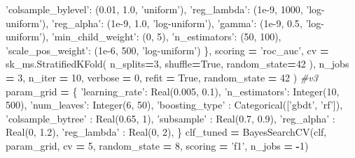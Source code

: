 \documentclass[]{book}
\newenvironment{Shaded}{\begin{snugshade}}{\end{snugshade}}
\newcommand{\DecValTok}[1]{\textcolor[rgb]{0.00,0.00,0.81}{#1}}
\newcommand{\FloatTok}[1]{\textcolor[rgb]{0.00,0.00,0.81}{#1}}
\newcommand{\StringTok}[1]{\textcolor[rgb]{0.31,0.60,0.02}{#1}}
\newcommand{\CommentTok}[1]{\textcolor[rgb]{0.56,0.35,0.01}{\textit{#1}}}
\newcommand{\VariableTok}[1]{\textcolor[rgb]{0.00,0.00,0.00}{#1}}
\newcommand{\OperatorTok}[1]{\textcolor[rgb]{0.81,0.36,0.00}{\textbf{#1}}}
\newcommand{\NormalTok}[1]{#1}
\begin{document}
\begin{Shaded}
\begin{Highlighting}[]
        \StringTok{'colsample_bylevel'}\NormalTok{: (}\FloatTok{0.01}\NormalTok{, }\FloatTok{1.0}\NormalTok{, }\StringTok{'uniform'}\NormalTok{),}
        \StringTok{'reg_lambda'}\NormalTok{: (}\FloatTok{1e-9}\NormalTok{, }\DecValTok{1000}\NormalTok{, }\StringTok{'log-uniform'}\NormalTok{),}
        \StringTok{'reg_alpha'}\NormalTok{: (}\FloatTok{1e-9}\NormalTok{, }\FloatTok{1.0}\NormalTok{, }\StringTok{'log-uniform'}\NormalTok{),}
        \StringTok{'gamma'}\NormalTok{: (}\FloatTok{1e-9}\NormalTok{, }\FloatTok{0.5}\NormalTok{, }\StringTok{'log-uniform'}\NormalTok{),}
        \StringTok{'min_child_weight'}\NormalTok{: (}\DecValTok{0}\NormalTok{, }\DecValTok{5}\NormalTok{),}
        \StringTok{'n_estimators'}\NormalTok{: (}\DecValTok{50}\NormalTok{, }\DecValTok{100}\NormalTok{),}
        \StringTok{'scale_pos_weight'}\NormalTok{: (}\FloatTok{1e-6}\NormalTok{, }\DecValTok{500}\NormalTok{, }\StringTok{'log-uniform'}\NormalTok{)}
\NormalTok{    \},    }
\NormalTok{    scoring }\OperatorTok{=} \StringTok{'roc_auc'}\NormalTok{,}
\NormalTok{    cv }\OperatorTok{=}\NormalTok{ sk_ms.StratifiedKFold(}
\NormalTok{        n_splits}\OperatorTok{=}\DecValTok{3}\NormalTok{,}
\NormalTok{        shuffle}\OperatorTok{=}\VariableTok{True}\NormalTok{,}
\NormalTok{        random_state}\OperatorTok{=}\DecValTok{42}
\NormalTok{    ),}
\NormalTok{    n_jobs }\OperatorTok{=} \DecValTok{3}\NormalTok{,}
\NormalTok{    n_iter }\OperatorTok{=} \DecValTok{10}\NormalTok{,   }
\NormalTok{    verbose }\OperatorTok{=} \DecValTok{0}\NormalTok{,}
\NormalTok{    refit }\OperatorTok{=} \VariableTok{True}\NormalTok{,}
\NormalTok{    random_state }\OperatorTok{=} \DecValTok{42}
\NormalTok{)}
\CommentTok{#v3}
\NormalTok{param_grid }\OperatorTok{=}\NormalTok{ \{}
    \StringTok{'learning_rate'}\NormalTok{: Real(}\FloatTok{0.005}\NormalTok{, }\FloatTok{0.1}\NormalTok{), }\StringTok{'n_estimators'}\NormalTok{: Integer(}\DecValTok{10}\NormalTok{, }\DecValTok{500}\NormalTok{),}
    \StringTok{'num_leaves'}\NormalTok{: Integer(}\DecValTok{6}\NormalTok{, }\DecValTok{50}\NormalTok{), }\StringTok{'boosting_type'}\NormalTok{ : Categorical([}\StringTok{'gbdt'}\NormalTok{, }\StringTok{'rf'}\NormalTok{]),}
    \StringTok{'colsample_bytree'}\NormalTok{ : Real(}\FloatTok{0.65}\NormalTok{, }\DecValTok{1}\NormalTok{), }\StringTok{'subsample'}\NormalTok{ : Real(}\FloatTok{0.7}\NormalTok{, }\FloatTok{0.9}\NormalTok{),}
    \StringTok{'reg_alpha'}\NormalTok{ : Real(}\DecValTok{0}\NormalTok{, }\FloatTok{1.2}\NormalTok{), }\StringTok{'reg_lambda'}\NormalTok{ : Real(}\DecValTok{0}\NormalTok{, }\DecValTok{2}\NormalTok{),}
\NormalTok{    \}}
\NormalTok{clf_tuned }\OperatorTok{=}\NormalTok{ BayesSearchCV(clf, param_grid, cv }\OperatorTok{=} \DecValTok{5}\NormalTok{, random_state }\OperatorTok{=} \DecValTok{8}\NormalTok{, scoring }\OperatorTok{=} \StringTok{'f1'}\NormalTok{, n_jobs }\OperatorTok{=} \OperatorTok{-}\DecValTok{1}\NormalTok{)}
\end{Highlighting}
\end{Shaded}
\end{document}
